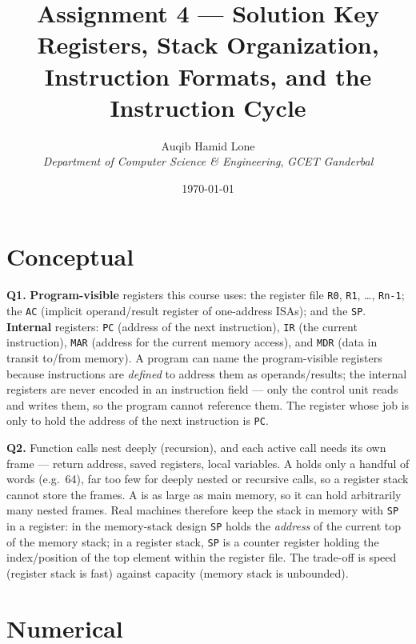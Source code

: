 \documentclass[11pt]{article}
\title{Assignment 4 --- Solution Key\\\large Registers, Stack Organization, Instruction Formats, and the Instruction Cycle}
\author{Auqib Hamid Lone\\[0.3em]
  \emph{Department of Computer Science \& Engineering}, \emph{GCET Ganderbal}}
\date{\today}
\begin{document}
\maketitle

\section{Conceptual}

\textbf{Q1.} \textbf{Program-visible} registers this course uses: the  register file \texttt{R0}, \texttt{R1}, \dots, \texttt{Rn-1}; the  \texttt{AC} (implicit operand/result register of one-address ISAs); and the  \texttt{SP}. \textbf{Internal} registers: \texttt{PC} (address of the next instruction), \texttt{IR} (the current instruction), \texttt{MAR} (address for the current memory access), and \texttt{MDR} (data in transit to/from memory). A program can name the program-visible registers because instructions are \emph{defined} to address them as operands/results; the internal registers are never encoded in an instruction field --- only the control unit reads and writes them, so the program cannot reference them. The register whose job is only to hold the address of the next instruction is \texttt{PC}.

\textbf{Q2.} Function calls nest deeply (recursion), and each active call needs its own frame --- return address, saved registers, local variables. A  holds only a handful of words (e.g.\ 64), far too few for deeply nested or recursive calls, so a register stack cannot store the frames. A  is as large as main memory, so it can hold arbitrarily many nested frames. Real machines therefore keep the stack in memory with \texttt{SP} in a register: in the memory-stack design \texttt{SP} holds the \emph{address} of the current top of the memory stack; in a register stack, \texttt{SP} is a counter register holding the index/position of the top element within the register file. The trade-off is speed (register stack is fast) against capacity (memory stack is unbounded).

\section{Numerical}
\end{document}
